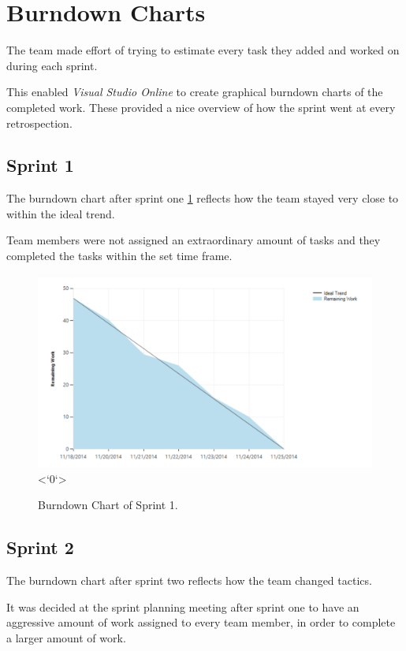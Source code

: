 \section{Burndown Charts}
The team made effort of trying to estimate every task they added and worked on during each sprint.


This enabled \textit{Visual Studio Online} to create graphical burndown charts of the completed work. These provided a nice overview of how the sprint went at every retrospection.

\subsection{Sprint 1}
The burndown chart after sprint one \ref{fig:burndown1} reflects how the team stayed very close to within the ideal trend. 


Team members were not assigned an extraordinary amount of tasks and they completed the tasks within the set time frame.

\begin{figure}[H]
	\centering
	\includegraphics[scale=0.40]{Figures/Burndown1}
    \label{fig:burndown1}<`0`>
	\caption{Burndown Chart of Sprint 1.}
\end{figure}

\subsection{Sprint 2}
The burndown chart after sprint two reflects how the team changed tactics. 

It was decided at the sprint planning meeting after sprint one to have an aggressive amount of work assigned to every team member, in order to complete a larger amount of work. 

